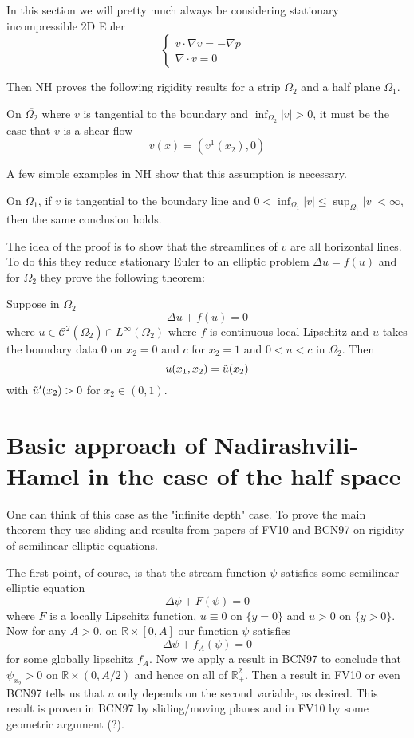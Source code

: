 In this section we will pretty much always be considering stationary incompressible 2D Euler 
\[\begin{cases}
    v \cdot \nabla v = -\nabla p & \\
    \nabla \cdot v = 0 & 
\end{cases}\]

Then NH proves the following rigidity results for a strip $\Omega_2$ and a half plane $\Omega_1$.

\begin{theorem}
    On $\overline{\Omega_2}$ where $v$ is tangential to the boundary and $\inf_{\Omega_2}|v| > 0$, it must be the case that $v$ is a shear flow
    \[v(x) = (v^1(x_2), 0)\]
\end{theorem}
A few simple examples in NH show that this assumption is necessary.

\begin{theorem}
    On $\Omega_1$, if $v$ is tangential to the boundary line and $0 < \inf_{\Omega_1}|v| \leq \sup_{\Omega_1}|v| < \infty$, then the same conclusion holds.
\end{theorem}
The idea of the proof is to show that the streamlines of $v$ are all horizontal lines. To do this they reduce stationary Euler to an elliptic problem $\Delta u = f(u)$ and for $\Omega_2$ they prove the following theorem:

\begin{theorem}
    Suppose in $\Omega_2$ 
    \[\Delta u + f(u) = 0\] where $u \in \mathcal{C}^2(\overline{\Omega_2}) \cap L^\infty(\Omega_2)$ where $f$ is continuous local Lipschitz and $u$ takes the boundary data $0$ on $x_2 = 0$ and $c$ for $x_2 = 1$ and $0 < u < c$ in $\Omega_2$. Then
    \[u(x_1, x_2) = \Tilde{u}(x_2)\] with $\Tilde{u}'(x_2) > 0$ for $x_2 \in (0, 1)$.
\end{theorem}

\section{Basic approach of Nadirashvili-Hamel in the case of the half space}

One can think of this case as the "infinite depth" case. To prove the main theorem they use sliding and results from papers of FV10 and BCN97 on rigidity of semilinear elliptic equations.

The first point, of course, is that the stream function $\psi$ satisfies some semilinear elliptic equation
\[\Delta \psi + F(\psi) = 0\]
where $F$ is a locally Lipschitz function, $u \equiv 0$ on $\{y = 0\}$ and $u > 0$ on $\{y > 0\}$. Now for any $A > 0$, on $\mathbb{R} \times [0, A]$ our function $\psi$ satisfies
\[\Delta \psi + f_A(\psi) = 0\]
for some globally lipschitz $f_A$. Now we apply a result in BCN97 to conclude that $\psi_{x_2} > 0$ on $\mathbb{R} \times (0, A/2)$ and hence on all of $\mathbb{R}^2_+$. Then a result in FV10 or even BCN97 tells us that $u$ only depends on the second variable, as desired. This result is proven in BCN97 by sliding/moving planes and in FV10 by some geometric argument (?).

